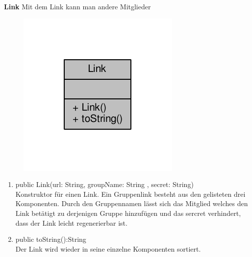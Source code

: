 \textbf{Link}
Mit dem Link kann man andere Mitglieder 
\begin{figure}[H]
	\includegraphics[scale = 1]{res/umlClasses/link__coll__graph.pdf}
	\centering
\end{figure}
\begin{enumerate}
	\item public Link(url: String, groupName: String , secret: String)\\
		Konstruktor für einen Link. Ein Gruppenlink besteht aus den gelisteten drei Komponenten. Durch den Gruppennamen lässt sich das Mitglied welches den Link betätigt zu derjenigen Gruppe hinzufügen und das sercret verhindert, dass der Link leicht regenerierbar ist.
	\item public toString():String\\
		Der Link wird wieder in seine einzelne Komponenten sortiert.
\end{enumerate}

